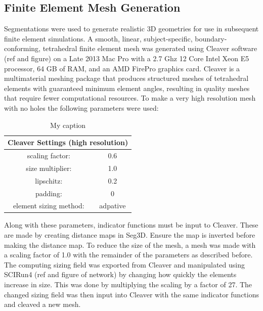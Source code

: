 \subsection{Finite Element Mesh Generation}
\label{sec:mesh}


Segmentations were used to generate realistic 3D geometries for use in subsequent finite element simulations. A smooth, linear, subject-specific, boundary-conforming, tetrahedral finite element mesh was generated using Cleaver software (ref and figure) on a Late 2013 Mac Pro with a 2.7 Ghz 12 Core Intel Xeon E5 processor, 64 GB of RAM, and an AMD FirePro graphics card. Cleaver is a multimaterial meshing package that produces structured meshes of tetrahedral elements with guaranteed minimum element angles, resulting in quality meshes that require fewer computational resources. To make a very high resolution mesh with no holes the following parameters were used: 
\begin{table}[H]
\centering
\caption{My caption}
\label{my-label}
\begin{tabular}{|c|c|}
\hline
\multicolumn{2}{|c|}{Cleaver Settings (high resolution)} \\ \hline
scaling factor:                    & 0.6                 \\ \hline
size multiplier:                   & 1.0                 \\ \hline
lipschitz:                         & 0.2                 \\ \hline
padding:                           & 0                   \\ \hline
element sizing method:             & adpative            \\ \hline
\end{tabular}
\end{table}

 Along with these parameters, indicator functions must be input to Cleaver. These are made by creating distance maps in Seg3D. Ensure the map is inverted before making the distance map. To reduce the size of the mesh, a mesh was made with a scaling factor of 1.0 with the remainder of the parameters as described before. The computing sizing field was exported from Cleaver and manipulated using SCIRun4 (ref and figure of network) by changing how quickly the elements increase in size. This was done by multiplying the scaling by a factor of 27. The changed sizing field was then input into Cleaver with the same indicator functions and cleaved a new mesh.

